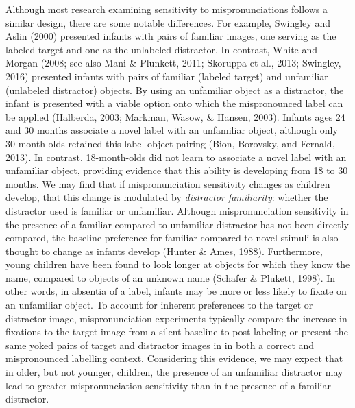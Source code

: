 \documentclass[man]{apa6}
\theoremstyle{definition}
\theoremstyle{definition}
\theoremstyle{definition}
\theoremstyle{remark}
\begin{document}
Although most research examining sensitivity to mispronunciations
follows a similar design, there are some notable differences. For
example, Swingley and Aslin (2000) presented infants with pairs of
familiar images, one serving as the labeled target and one as the
unlabeled distractor. In contrast, White and Morgan (2008; see also Mani
\& Plunkett, 2011; Skoruppa et al., 2013; Swingley, 2016) presented
infants with pairs of familiar (labeled target) and unfamiliar
(unlabeled distractor) objects. By using an unfamiliar object as a
distractor, the infant is presented with a viable option onto which the
mispronounced label can be applied (Halberda, 2003; Markman, Wasow, \&
Hansen, 2003). Infants ages 24 and 30 months associate a novel label
with an unfamiliar object, although only 30-month-olds retained this
label-object pairing (Bion, Borovsky, and Fernald, 2013). In contrast,
18-month-olds did not learn to associate a novel label with an
unfamiliar object, providing evidence that this ability is developing
from 18 to 30 months. We may find that if mispronunciation sensitivity
changes as children develop, that this change is modulated by
\emph{distractor familiarity}: whether the distractor used is familiar
or unfamiliar. Although mispronunciation sensitivity in the presence of
a familiar compared to unfamiliar distractor has not been directly
compared, the baseline preference for familiar compared to novel stimuli
is also thought to change as infants develop (Hunter \& Ames, 1988).
Furthermore, young children have been found to look longer at objects
for which they know the name, compared to objects of an unknown name
(Schafer \& Plukett, 1998). In other words, in absentia of a label,
infants may be more or less likely to fixate on an unfamiliar object. To
account for inherent preferences to the target or distractor image,
mispronunciation experiments typically compare the increase in fixations
to the target image from a silent baseline to post-labeling or present
the same yoked pairs of target and distractor images in in both a
correct and mispronounced labelling context. Considering this evidence,
we may expect that in older, but not younger, children, the presence of
an unfamiliar distractor may lead to greater mispronunciation
sensitivity than in the presence of a familiar distractor.
\end{document}
